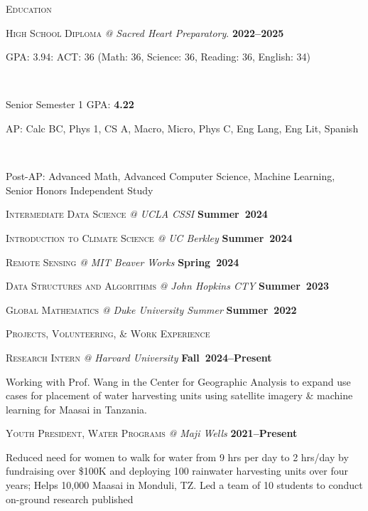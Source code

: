 \documentclass[10pt, letter]{article}
\newcommand{\dates}[1]{\hfill\mbox{\ttfamily\textbf{#1}}}
\newcommand{\smaller}[1]{%
    \noindent\makebox[1.2em][l]{$\diamond$}%
    \parbox[t]{\dimexpr\linewidth-1.5em}{\small#1}%
}
\newcommand{\headright}[1]{\vspace*{1.5ex}\textsc{\Large\color{cvcolor}#1}\par%
     \vspace*{-2ex}{\color{cvcolor}\hrulefill}\par}
\begin{document}
\begin{minipage}[t]{0.56\textwidth}
\setlength{\parskip}{0.6ex}%

\vspace{3ex}


\headright{Education}

\textsc{High School Diploma} \textit{@ Sacred Heart Preparatory}. \dates{2022--2025} \\
\smaller {GPA: 3.94: ACT: 36 (Math: 36, Science: 36, Reading: 36, English: 34)}\\
\smaller {Senior Semester 1 GPA: \textbf{4.22}}
\smaller{AP: Calc BC, Phys 1, CS A,  Macro, Micro, Phys C, Eng Lang, Eng Lit, Spanish}\\
\smaller{Post-AP: Advanced Math, Advanced Computer Science, Machine Learning, Senior Honors Independent Study}

\textsc{Intermediate Data Science} \textit{@ UCLA CSSI} \dates{Summer 2024}

\textsc{Introduction to Climate Science} \textit{@ UC Berkley} \dates{Summer 2024}

\textsc{Remote Sensing} \textit{@ MIT Beaver Works} \dates{Spring 2024}

\textsc{Data Structures and Algorithms} \textit{@ John Hopkins CTY} \dates{Summer 2023}

\textsc{Global Mathematics} \textit{@ Duke University Summer} \dates{Summer 2022}



\headright{Projects, Volunteering, \& Work Experience}

\textsc{Research Intern} \textit{@ Harvard University}  \dates{Fall 2024--Present} \\
\smaller{Working with Prof. Wang in the Center for Geographic Analysis to expand use cases for placement of water harvesting units using satellite imagery \& machine learning for Maasai in Tanzania.}

\textsc{Youth President, Water Programs} \textit{@ Maji Wells}  \dates{2021--Present} \\
\smaller{Reduced need for women to walk for water from 9 hrs per day to 2 hrs/day by fundraising over \$100K and deploying 100 rainwater harvesting units over four years; Helps 10,000 Maasai in Monduli, TZ. Led a team of 10 students to conduct on-ground research published}


\end{minipage}
\end{document}
